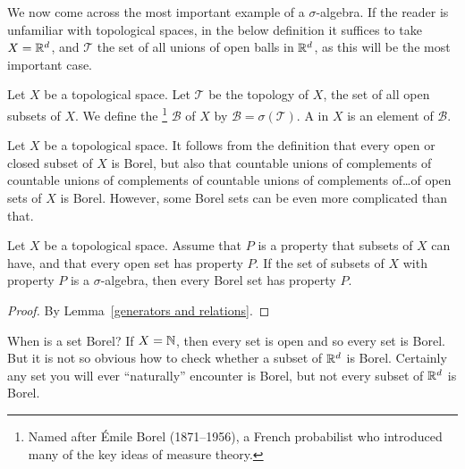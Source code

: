 \begin{subsec}
We now come across the most important example of a $\sigma$-algebra.
If the reader is unfamiliar with topological spaces, in the below definition it suffices to take $X = \mathbb{R}^{d}$, and $\mathcal T$ the set of all unions of open balls in $\mathbb{R}^{d}$, as this will be the most important case.
\end{subsec}

\begin{definition}
Let $X$ be a topological space.
Let $\mathcal T$ be the topology of $X$, the set of all open subsets of $X$.
We define the \footnote{Named after Émile Borel (1871--1956), a French probabilist who introduced many of the key ideas of measure theory.}
$\mathcal B$ of $X$ by $\mathcal B = \sigma(\mathcal T)$.
A  in $X$ is an element of $\mathcal B$.
\end{definition}

\begin{subsec}
Let $X$ be a topological space.
It follows from the definition that every open or closed subset of $X$ is Borel, but also that countable unions of complements of countable unions of complements of countable unions of complements of\dots of open sets of $X$ is Borel.
However, some Borel sets can be even more complicated than that.
\end{subsec}

\begin{lemma}
Let $X$ be a topological space.
Assume that $P$ is a property that subsets of $X$ can have, and that every open set has property $P$.
If the set of subsets of $X$ with property $P$ is a $\sigma$-algebra, then every Borel set has property $P$.
\end{lemma}
\begin{proof}
By Lemma~\ref{generators and relations}.
\end{proof}

\begin{subsec}
When is a set Borel? If $X = \mathbb{N}$, then every set is open and so every set is Borel.
But it is not so obvious how to check whether a subset of $\mathbb{R}^{d}$ is Borel.
Certainly any set you will ever ``naturally'' encounter is Borel, but not every subset of $\mathbb{R}^{d}$ is Borel.
\end{subsec}

